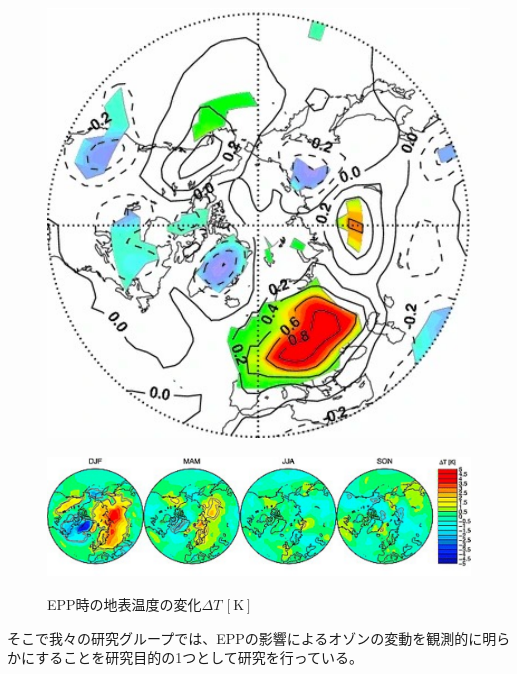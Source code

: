 \begin{figure}[htbp]
    \centering
    \begin{minipage}{\linewidth}
        \centering
        \includegraphics[scale=0.6]{master_thesis_contents/master_thesis_fig/rozanov2012_fig12.pdf}
        \label{fig:rozanov2012_fig12}
    \end{minipage}
    \begin{minipage}{\linewidth}
        \centering
        \includegraphics[scale=0.6]{master_thesis_contents/master_thesis_fig/seppala2009_fig3.pdf}
        \label{fig:seppala2009_fig3}
    \end{minipage}
    \caption{EPP時の地表温度の変化$\Delta T\, \mathrm{[K]}$}
    \label{fig:rozanov2012_seppala2009}
\end{figure}
そこで我々の研究グループでは、EPPの影響によるオゾンの変動を観測的に明らかにすることを研究目的の1つとして研究を行っている。
